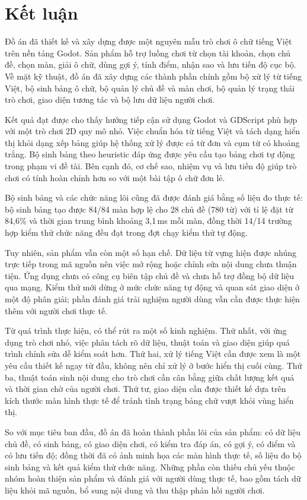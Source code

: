 \documentclass[../DoAn.tex]{subfiles}
\begin{document}
\section{Kết luận}
Đồ án đã thiết kế và xây dựng được một nguyên mẫu trò chơi ô chữ tiếng Việt trên nền tảng Godot. Sản phẩm hỗ trợ luồng chơi từ chọn tài khoản, chọn chủ đề, chọn màn, giải ô chữ, dùng gợi ý, tính điểm, nhận sao và lưu tiến độ cục bộ. Về mặt kỹ thuật, đồ án đã xây dựng các thành phần chính gồm bộ xử lý từ tiếng Việt, bộ sinh bảng ô chữ, bộ quản lý chủ đề và màn chơi, bộ quản lý trạng thái trò chơi, giao diện tương tác và bộ lưu dữ liệu người chơi.

Kết quả đạt được cho thấy hướng tiếp cận sử dụng Godot và GDScript phù hợp với một trò chơi 2D quy mô nhỏ. Việc chuẩn hóa từ tiếng Việt và tách dạng hiển thị khỏi dạng xếp bảng giúp hệ thống xử lý được cả từ đơn và cụm từ có khoảng trắng. Bộ sinh bảng theo heuristic đáp ứng được yêu cầu tạo bảng chơi tự động trong phạm vi đề tài. Bên cạnh đó, cơ chế sao, nhiệm vụ và lưu tiến độ giúp trò chơi có tính hoàn chỉnh hơn so với một bài tập ô chữ đơn lẻ.

Bộ sinh bảng và các chức năng lõi cũng đã được đánh giá bằng số liệu đo thực tế: bộ sinh bảng tạo được 84/84 màn hợp lệ cho 28 chủ đề (780 từ) với tỉ lệ đặt từ 84,6\% và thời gian trung bình khoảng 3,1\,ms mỗi màn, đồng thời 14/14 trường hợp kiểm thử chức năng đều đạt trong đợt chạy kiểm thử tự động.

Tuy nhiên, sản phẩm vẫn còn một số hạn chế. Dữ liệu từ vựng hiện được nhúng trực tiếp trong mã nguồn nên việc mở rộng hoặc chỉnh sửa nội dung chưa thuận tiện. Ứng dụng chưa có công cụ biên tập chủ đề và chưa hỗ trợ đồng bộ dữ liệu qua mạng. Kiểm thử mới dừng ở mức chức năng tự động và quan sát giao diện ở một độ phân giải; phần đánh giá trải nghiệm người dùng vẫn cần được thực hiện thêm với người chơi thực tế.

Từ quá trình thực hiện, có thể rút ra một số kinh nghiệm. Thứ nhất, với ứng dụng trò chơi nhỏ, việc phân tách rõ dữ liệu, thuật toán và giao diện giúp quá trình chỉnh sửa dễ kiểm soát hơn. Thứ hai, xử lý tiếng Việt cần được xem là một yêu cầu thiết kế ngay từ đầu, không nên chỉ xử lý ở bước hiển thị cuối cùng. Thứ ba, thuật toán sinh nội dung cho trò chơi cần cân bằng giữa chất lượng kết quả và thời gian chờ của người chơi. Thứ tư, giao diện cần được thiết kế dựa trên kích thước màn hình thực tế để tránh tình trạng bảng chữ vượt khỏi vùng hiển thị.

So với mục tiêu ban đầu, đồ án đã hoàn thành phần lõi của sản phẩm: có dữ liệu chủ đề, có sinh bảng, có giao diện chơi, có kiểm tra đáp án, có gợi ý, có điểm và có lưu tiến độ; đồng thời đã có ảnh minh họa các màn hình thực tế, số liệu đo bộ sinh bảng và kết quả kiểm thử chức năng. Những phần còn thiếu chủ yếu thuộc nhóm hoàn thiện sản phẩm và đánh giá với người dùng thực tế, bao gồm tách dữ liệu khỏi mã nguồn, bổ sung nội dung và thu thập phản hồi người chơi.
\end{document}
